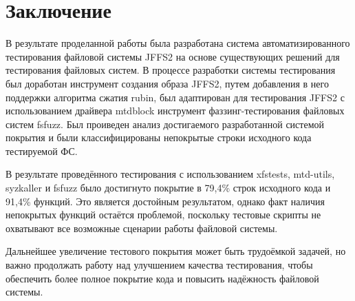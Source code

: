 \section{Заключение}
\label{sec:Chapter5} 

В результате проделанной работы была разработана система автоматизированного тестирования файловой системы JFFS2 на основе существующих решений для тестирования файловых систем. В процессе разработки системы тестирования был доработан инструмент создания образа JFFS2, путем добавления в него поддержки алгоритма сжатия rubin, был адаптирован для тестирования JFFS2 с использованием драйвера mtdblock инструмент фаззинг-тестирования файловых систем fsfuzz. Был проиведен анализ достигаемого разработанной системой покрытия и были классифицированы непокрытые строки исходного кода тестируемой ФС.

В результате проведённого тестирования с использованием xfstests, mtd-utils, syzkaller и fsfuzz было достигнуто покрытие в 79,4\% строк исходного кода и 91,4\% функций. Это является достойным результатом, однако факт наличия непокрытых функций остаётся проблемой, поскольку тестовые скрипты не охватывают все возможные сценарии работы файловой системы.

Дальнейшее увеличение тестового покрытия может быть трудоёмкой задачей, но важно продолжать работу над улучшением качества тестирования, чтобы обеспечить более полное покрытие кода и повысить надёжность файловой системы.

\newpage
